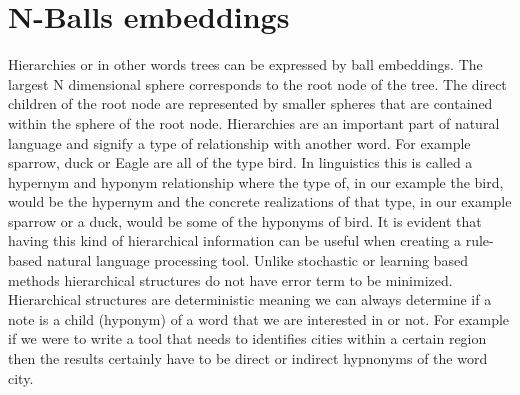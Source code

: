 \documentclass[]{article}
\begin{document}
\section{N-Balls embeddings}
\label{sec::ball}
Hierarchies or in other words trees can be expressed by ball embeddings. The largest N dimensional sphere corresponds to the root node of the tree. The direct children of the root node are represented by smaller spheres that are contained within the sphere of the root node. Hierarchies are an important part of natural language and signify a type of relationship with another word. For example sparrow, duck or Eagle are all of the type bird. In linguistics this is called a hypernym and hyponym relationship where the type of, in our example the bird, would be the hypernym and the concrete realizations of that type, in our example sparrow or a duck, would be some of the hyponyms of bird. It is evident that having this kind of hierarchical information can be useful when creating a rule-based natural language processing tool. Unlike stochastic or learning based methods hierarchical structures do not have error term to be minimized. Hierarchical structures are deterministic meaning we can always determine if a note is a child (hyponym) of a word that we are interested in or not. For example if we were to write a tool that needs to identifies cities within a certain region then the results certainly have to be direct or indirect hypnonyms of the word city.
\par
\end{document}
